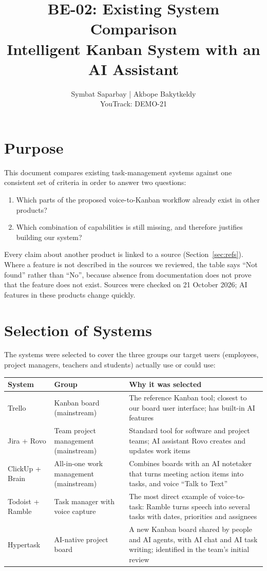 \documentclass[11pt,a4paper]{article}
\title{\textbf{BE-02: Existing System Comparison}\\[4pt]
\large Intelligent Kanban System with an AI Assistant}
\author{Symbat Saparbay | Akbope Bakytkeldy\\ \small YouTrack: DEMO-21}
\date{}
\newcommand{\tblstart}{\small\rowcolors{2}{gray!7}{white}}
\begin{document}
\maketitle

\section{Purpose}

This document compares existing task-management systems against one consistent set of criteria in order to answer two questions:
\begin{enumerate}
  \item Which parts of the proposed voice-to-Kanban workflow already exist in other products?
  \item Which combination of capabilities is still missing, and therefore justifies building our system?
\end{enumerate}

Every claim about another product is linked to a source (Section~\ref{sec:refs}). Where a feature is not described in the sources we reviewed, the table says ``Not found'' rather than ``No'', because absence from documentation does not prove that the feature does not exist. Sources were checked on 21 October 2026; AI features in these products change quickly.

\section{Selection of Systems}

The systems were selected to cover the three groups our target users (employees, project managers, teachers and students) actually use or could use:

{\tblstart
\begin{xltabular}{\textwidth}{P{2.6cm} P{4.2cm} L}
\toprule
\textbf{System} & \textbf{Group} & \textbf{Why it was selected} \\
\midrule
\endhead
Trello & Kanban board (mainstream) & The reference Kanban tool; closest to our board user interface; has built-in AI features \\
Jira + Rovo & Team project management (mainstream) & Standard tool for software and project teams; AI assistant Rovo creates and updates work items \\
ClickUp + Brain & All-in-one work management (mainstream) & Combines boards with an AI notetaker that turns meeting action items into tasks, and voice ``Talk to Text'' \\
Todoist + Ramble & Task manager with voice capture & The most direct example of voice-to-task: Ramble turns speech into several tasks with dates, priorities and assignees \\
Hypertask & AI-native project board & A new Kanban board shared by people and AI agents, with AI chat and AI task writing; identified in the team's initial review \\
\bottomrule
\end{xltabular}}
\end{document}
